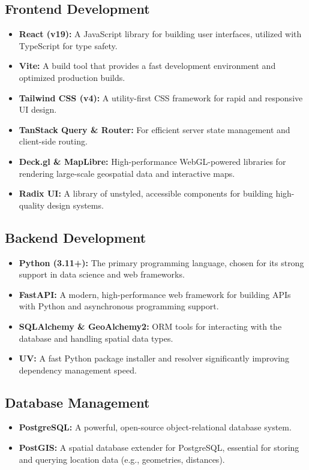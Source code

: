 \subsection{Frontend Development}
\begin{itemize}
    \item \textbf{React (v19):} A JavaScript library for building user interfaces, utilized with TypeScript for type safety.
    \item \textbf{Vite:} A build tool that provides a fast development environment and optimized production builds.
    \item \textbf{Tailwind CSS (v4):} A utility-first CSS framework for rapid and responsive UI design.
    \item \textbf{TanStack Query \& Router:} For efficient server state management and client-side routing.
    \item \textbf{Deck.gl \& MapLibre:} High-performance WebGL-powered libraries for rendering large-scale geospatial data and interactive maps.
    \item \textbf{Radix UI:} A library of unstyled, accessible components for building high-quality design systems.
\end{itemize}

\subsection{Backend Development}
\begin{itemize}
    \item \textbf{Python (3.11+):} The primary programming language, chosen for its strong support in data science and web frameworks.
    \item \textbf{FastAPI:} A modern, high-performance web framework for building APIs with Python and asynchronous programming support.
    \item \textbf{SQLAlchemy \& GeoAlchemy2:} ORM tools for interacting with the database and handling spatial data types.
    \item \textbf{UV:} A fast Python package installer and resolver significantly improving dependency management speed.
\end{itemize}

\subsection{Database Management}
\begin{itemize}
    \item \textbf{PostgreSQL:} A powerful, open-source object-relational database system.
    \item \textbf{PostGIS:} A spatial database extender for PostgreSQL, essential for storing and querying location data (e.g., geometries, distances).
\end{itemize}

